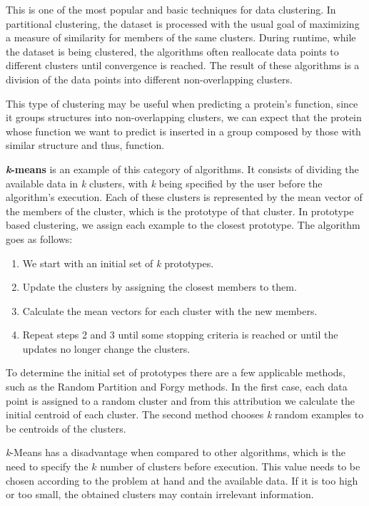This is one of the most popular and basic techniques for data clustering. In partitional clustering, the dataset is processed with the usual goal of maximizing a measure of similarity for members of the same clusters. During runtime, while the dataset is being clustered, the algorithms often reallocate data points to different clusters until convergence is reached. The result of these algorithms is a division of the data points into different non-overlapping clusters.

This type of clustering may be useful when predicting a protein's function, since it groups structures into non-overlapping clusters, we can expect that the protein whose function we want to predict is inserted in a group composed by those with similar structure and thus, function.

\textbf{\textit{k}-means} \cite{ethemalpaydin2010} is an example of this category of algorithms. It consists of dividing the available data in \textit{k} clusters, with \textit{k} being specified by the user before the algorithm's execution. Each of these clusters is represented by the mean vector of the members of the cluster, which is the prototype of that cluster. In prototype based clustering, we assign each example to the closest prototype. The algorithm goes as follows:

\begin{enumerate}
	\item We start with an initial set of \textit{k} prototypes.
	\item Update the clusters by assigning the closest members to them.
	\item Calculate the mean vectors for each cluster with the new members.
	\item Repeat steps 2 and 3 until some stopping criteria is reached or until the updates no longer change the clusters.
\end{enumerate}

To determine the initial set of prototypes there are a few applicable methods, such as the Random Partition and Forgy methods. In the first case, each data point is assigned to a random cluster and from this attribution we calculate the initial centroid of each cluster. The second method chooses \textit{k} random examples to be centroids of the clusters.

\textit{k}-Means has a disadvantage when compared to other algorithms, which is the need to specify the $k$ number of clusters before execution. This value needs to be chosen according to the problem at hand and the available data. If it is too high or too small, the obtained clusters may contain irrelevant information.

